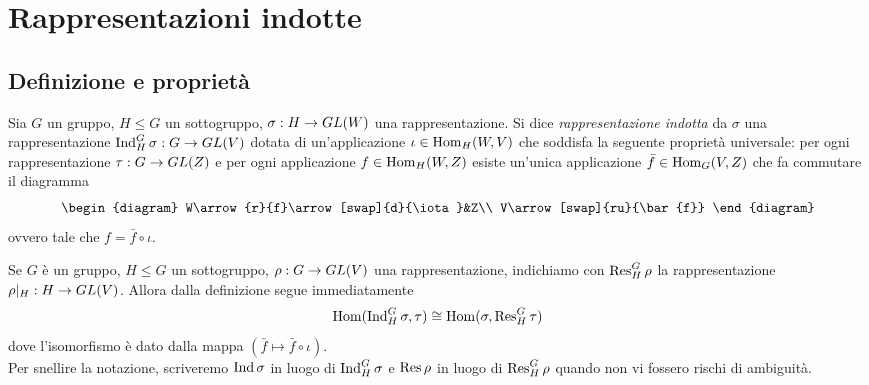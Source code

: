 \chapter{Rappresentazioni indotte}

\section{Definizione e proprietà}

\begin{definition}
Sia $G$ un gruppo, $H\le G$ un sottogruppo, $\sigma:H\to GL(W)$ una rappresentazione. Si dice \emph{rappresentazione indotta} da $\sigma$ una rappresentazione $\operatorname{Ind}_H^G\sigma:G\to GL(V)$ dotata di un'applicazione $\iota\in\operatorname{Hom}_H(W,V)$ che soddisfa la seguente proprietà universale: per ogni rappresentazione $\tau:G\to GL(Z)$ e per ogni applicazione $f\in\operatorname{Hom}_H(W,Z)$ esiste un'unica applicazione $\bar{f}\in\operatorname{Hom}_G(V,Z)$ che fa commutare il diagramma
$$
\begin{diagram}
W\arrow{r}{f}\arrow[swap]{d}{\iota}&Z\\
V\arrow[swap]{ru}{\bar{f}}
\end{diagram}
$$
ovvero tale che $f=\bar{f}\circ\iota$.
\end{definition}

Se $G$ è un gruppo, $H\le G$ un sottogruppo, $\rho:G\to GL(V)$ una rappresentazione, indichiamo con $\operatorname{Res}_H^G\rho$ la rappresentazione $\rho|_H:H\to GL(V)$. Allora dalla definizione segue immediatamente
$$
\operatorname{Hom}(\operatorname{Ind}_H^G\sigma,\tau)\cong\operatorname{Hom}(\sigma,\operatorname{Res}_H^G\tau)
$$
dove l'isomorfismo è dato dalla mappa $(\bar{f}\mapsto\bar{f}\circ\iota)$.\\
Per snellire la notazione, scriveremo $\operatorname{Ind}\sigma$ in luogo di $\operatorname{Ind}_H^G\sigma$ e $\operatorname{Res}\rho$ in luogo di $\operatorname{Res}_H^G\rho$ quando non vi fossero rischi di ambiguità.


